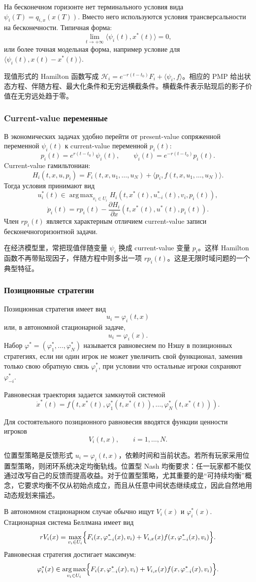 \documentclass[12pt,a4paper]{article}
\DeclareMathOperator*{\argmax}{arg\,max}
\newcommand{\zh}[1]{\par\noindent #1\par}
\begin{document}
На бесконечном горизонте нет терминального условия вида $\psi_i(T)=q_{i,x}(x(T))$. Вместо него используются условия трансверсальности на бесконечности. Типичная форма:
\[
 \lim_{t\to+\infty}\langle\psi_i(t),x^*(t)\rangle=0,
\]
или более точная модельная форма, например условие для $\langle \psi_i(t),x(t)-x^*(t)\rangle$.
\zh{现值形式的 Hamilton 函数写成 \(\mathcal H_i=e^{-r(t-t_0)}F_i+\langle\psi_i,f\rangle\)。相应的 PMP 给出状态方程、伴随方程、最大化条件和无穷远横截条件。横截条件表示贴现后的影子价值在无穷远处趋于零。}

\subsubsection{Current-value переменные}

В экономических задачах удобно перейти от present-value сопряженной переменной $\psi_i(t)$ к current-value переменной $p_i(t)$:
\[
 p_i(t)=e^{r(t-t_0)}\psi_i(t),\qquad \psi_i(t)=e^{-r(t-t_0)}p_i(t).
\]
Current-value гамильтониан:
\[
 H_i(t,x,u,p_i)=F_i(t,x,u_1,\ldots,u_N)+\langle p_i,f(t,x,u_1,\ldots,u_N)\rangle.
\]
Тогда условия принимают вид
\[
 u_i^*(t)\in\argmax_{v_i\in U_i}H_i(t,x^*(t),u_{-i}^*(t),v_i,p_i(t)),
\]
\[
 \dot p_i(t)=r p_i(t)-\frac{\partial H_i}{\partial x}(t,x^*(t),u^*(t),p_i(t)).
\]
Член $r p_i(t)$ является характерным отличием current-value записи бесконечногоризонтной задачи.
\zh{在经济模型里，常把现值伴随变量 \(\psi_i\) 换成 current-value 变量 \(p_i\)。这样 Hamilton 函数不再带贴现因子，伴随方程中则多出一项 \(r p_i(t)\)。这是无限时域问题的一个典型特征。}

\subsubsection{Позиционные стратегии}

Позиционная стратегия имеет вид
\[
 u_i=\varphi_i(t,x)
\]
или, в автономной стационарной задаче,
\[
 u_i=\varphi_i(x).
\]
Набор $\varphi^*=(\varphi_1^*,\ldots,\varphi_N^*)$ называется равновесием по Нэшу в позиционных стратегиях, если ни один игрок не может увеличить свой функционал, заменив только свою обратную связь $\varphi_i^*$, при условии что остальные игроки сохраняют $\varphi_{-i}^*$.

Равновесная траектория задается замкнутой системой
\[
 \dot x^*(t)=f(t,x^*(t),\varphi_1^*(t,x^*(t)),\ldots,\varphi_N^*(t,x^*(t))).
\]

Для состоятельного позиционного равновесия вводятся функции ценности игроков
\[
 V_i(t,x),\qquad i=1,\ldots,N.
\]
\zh{位置型策略是反馈形式 \(u_i=\varphi_i(t,x)\)，依赖时间和当前状态。若所有玩家采用位置型策略，则闭环系统决定均衡轨线。位置型 Nash 均衡要求：任一玩家都不能仅通过改写自己的反馈而提高收益。对于位置型策略，尤其重要的是“可持续均衡”概念，它要求均衡不仅从初始点成立，而且从任意中间状态继续成立，因此自然地用动态规划来描述。}
В автономном стационарном случае обычно ищут $V_i(x)$ и $\varphi_i^*(x)$. Стационарная система Беллмана имеет вид
\[
 rV_i(x)=\max_{v_i\in U_i}\Bigl\{F_i(x,\varphi_{-i}^*(x),v_i)+V_{i,x}(x)f(x,\varphi_{-i}^*(x),v_i)\Bigr\}.
\]
Равновесная стратегия достигает максимум:
\[
 \varphi_i^*(x)\in\argmax_{v_i\in U_i}\Bigl\{F_i(x,\varphi_{-i}^*(x),v_i)+V_{i,x}(x)f(x,\varphi_{-i}^*(x),v_i)\Bigr\}.
\]
\end{document}
